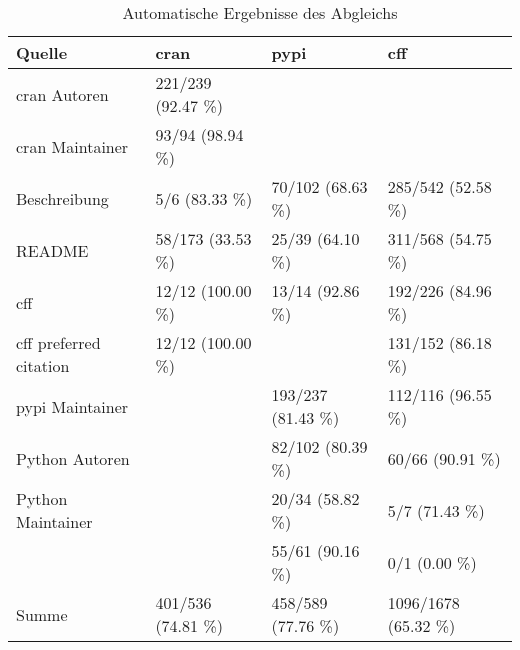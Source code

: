 \begin{table}[H]
    \footnotesize
    \centering
    \begin{tabularx}{\textwidth}{XR{3.2cm}R{3.2cm}R{3.2cm}}
        \toprule
        \textbf{Quelle}              & \textbf{\gls{cran}} & \textbf{\gls{pypi}} & \textbf{\gls{cff}}   \\ \midrule
        \gls{cran} Autoren           & 221/239 (92.47 \%)  &                     &                      \\
        \gls{cran} Maintainer        & 93/94 (98.94 \%)    &                     &                      \\
        Beschreibung                 & 5/6 (83.33 \%)      & 70/102 (68.63 \%)   & 285/542 (52.58 \%)   \\
        README                       & 58/173 (33.53 \%)   & 25/39 (64.10 \%)    & 311/568 (54.75 \%)   \\
        \gls{cff}                    & 12/12 (100.00 \%)   & 13/14 (92.86 \%)    & 192/226 (84.96 \%)   \\
        \gls{cff} preferred citation & 12/12 (100.00 \%)   &                     & 131/152 (86.18 \%)   \\
        \gls{pypi} Maintainer        &                     & 193/237 (81.43 \%)  & 112/116 (96.55 \%)   \\
        Python Autoren               &                     & 82/102 (80.39 \%)   & 60/66 (90.91 \%)     \\
        Python Maintainer            &                     & 20/34 (58.82 \%)    & 5/7 (71.43 \%)       \\
                      &                     & 55/61 (90.16 \%)    & 0/1 (0.00 \%)        \\ \midrule
        Summe                        & 401/536 (74.81 \%)  & 458/589 (77.76 \%)  & 1096/1678 (65.32 \%) \\
        \bottomrule
    \end{tabularx}
    \caption{Automatische Ergebnisse des Abgleichs}
    \label{tab:matching_results_auto_anhang}
\end{table}

